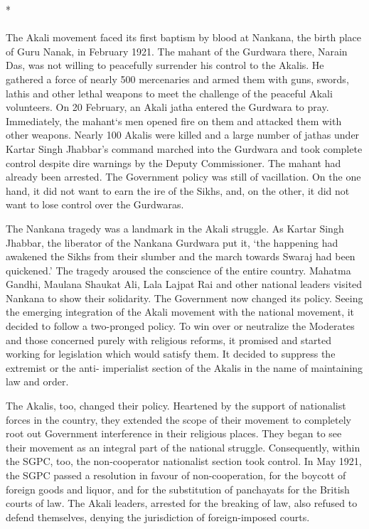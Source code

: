 \begin{multicols}{2}
\begin{center}*\end{center}

\paragraph*{}

The Akali movement faced its first baptism by blood at Nankana, the birth place of Guru Nanak, in February 1921. The mahant of the Gurdwara there, Narain Das, was not willing to peacefully surrender his control to the Akalis. He gathered a force of nearly 500 mercenaries and armed them with guns, swords, lathis and other lethal weapons to meet the challenge of the peaceful Akali volunteers. On 20 February, an Akali jatha entered the Gurdwara to pray. Immediately, the mahant`s men opened fire on them and attacked them with other weapons. Nearly 100 Akalis were killed and a large number of jathas under Kartar Singh Jhabbar's command marched into the Gurdwara and took complete control despite dire warnings by the Deputy Commissioner. The mahant had already been arrested. The Government policy was still of vacillation. On the one hand, it did not want to earn the ire of the Sikhs, and, on the other, it did not want to lose control over the Gurdwaras.

The Nankana tragedy was a landmark in the Akali struggle. As Kartar Singh Jhabbar, the liberator of the Nankana Gurdwara put it, `the happening had awakened the Sikhs from their slumber and the march towards Swaraj had been quickened.' The tragedy aroused the conscience of the entire country. Mahatma Gandhi, Maulana Shaukat Ali, Lala Lajpat Rai and other national leaders visited Nankana to show their solidarity. The Government now changed its policy. Seeing the emerging integration of the Akali movement with the national movement, it decided to follow a two-pronged policy. To win over or neutralize the Moderates and those concerned purely with religious reforms, it promised and started working for legislation which would satisfy them. It decided to suppress the extremist or the anti- imperialist section of the Akalis in the name of maintaining law and order.

The Akalis, too, changed their policy. Heartened by the support of nationalist forces in the country, they extended the scope of their movement to completely root out Government interference in their religious places. They began to see their movement as an integral part of the national struggle. Consequently, within the SGPC, too, the non-cooperator nationalist section took control. In May 1921, the SGPC passed a resolution in favour of non-cooperation, for the boycott of foreign goods and liquor, and for the substitution of panchayats for the British courts of law. The Akali leaders, arrested for the breaking of law, also refused to defend themselves, denying the jurisdiction of foreign-imposed courts.


\end{multicols}
